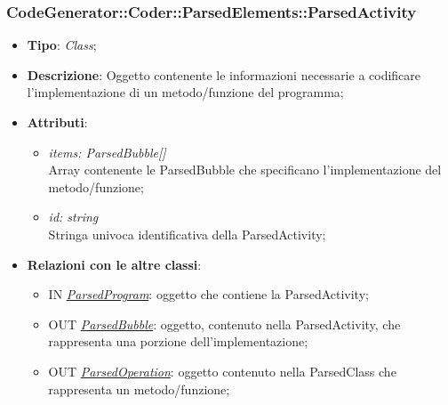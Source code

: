\documentclass[../DefinizioneDiProdotto.tex]{subfiles}
\begin{document}
		\subsubsection{CodeGenerator::Coder::ParsedElements::ParsedActivity}
		\hypertarget{SWEDesigner::Server::CodeGenerator::Coder::ParsedElements::ParsedActivity}{}
		\begin{itemize}
			\item \textbf{Tipo}: \emph{Class};
			\item \textbf{Descrizione}: Oggetto contenente le informazioni necessarie a codificare l'implementazione di un metodo/funzione del programma;
			\item \textbf{Attributi}:
			\begin{itemize}
				\item \emph{items: ParsedBubble[]} \\
				Array contenente le ParsedBubble che specificano l'implementazione del metodo/funzione;
				\item \emph{id: string} \\
				Stringa univoca identificativa della ParsedActivity;
			\end{itemize}
			\item \textbf{Relazioni con le altre classi}:	
			\begin{itemize}
				\item IN \hyperlink{SWEDesigner::Server::CodeGenerator::Coder::ParsedElements::ParsedProgram}{\emph{ParsedProgram}}: oggetto che contiene la ParsedActivity;
				\item OUT \hyperlink{SWEDesigner::Server::CodeGenerator::Coder::ParsedElements::ParsedBubble}{\emph{ParsedBubble}}: oggetto, contenuto nella ParsedActivity, che rappresenta una porzione dell'implementazione;
				\item OUT \hyperlink{SWEDesigner::Server::CodeGenerator::Coder::ParsedElements::ParsedOperation}{\emph{ParsedOperation}}: oggetto contenuto nella ParsedClass che rappresenta un metodo/funzione;
			\end{itemize}
		\end{itemize}
	
\end{document}
